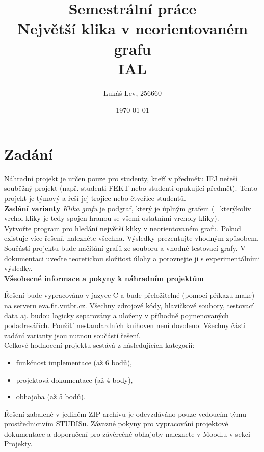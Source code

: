 \documentclass[a4paper]{article}
\title{\textbf{Semestrální práce}\\Největší klika v neorientovaném grafu\\[5pt]IAL}
\author{Lukáš Lev, 256660}
\date{\today}
\begin{document}
\maketitle
\newpage

\section{Zadání} \label{sec:zadani}
Náhradní projekt je určen pouze pro studenty, kteří v předmětu IFJ neřeší souběžný projekt (např. studenti FEKT nebo studenti opakující předmět). Tento projekt je týmový a řeší jej trojice nebo čtveřice studentů.\\

\noindent
\textbf{Zadání varianty}
\textit{Klika grafu} je podgraf, který je úplným grafem (=kterýkoliv vrchol kliky je tedy spojen hranou se všemi ostatními vrcholy kliky).\\

\noindent
Vytvořte program pro hledání největší kliky v neorientovaném grafu. Pokud existuje více řešení, nalezněte všechna. Výsledky prezentujte vhodným způsobem. Součástí projektu bude načítání grafů ze souboru a vhodné testovací grafy. V dokumentaci uveďte teoretickou složitost úlohy a porovnejte ji s experimentálními výsledky.\\

\noindent
\textbf{Všeobecné informace a pokyny k náhradním projektům}

\noindent
Řešení bude vypracováno v jazyce C a bude přeložitelné (pomocí příkazu make) na serveru eva.fit.vutbr.cz. Všechny zdrojové kódy, hlavičkové soubory, testovací data aj. budou logicky separovány a uloženy v příhodně pojmenovaných podadresářích. Použití nestandardních knihoven není dovoleno. Všechny části zadání varianty jsou nutnou součástí řešení.\\

\noindent
Celkové hodnocení projektu sestává z následujících kategorií:
\begin{itemize}
    \item funkčnost implementace (až 6 bodů),
    \item projektová dokumentace (až 4 body),
    \item obhajoba (až 5 bodů).
\end{itemize}

\noindent
Řešení zabalené v jediném ZIP archivu je odevzdáváno pouze vedoucím týmu prostřednictvím STUDISu. Závazné pokyny pro vypracování projektové dokumentace a doporučení pro závěrečné obhajoby naleznete v Moodlu v sekci Projekty.
    
\end{document}
